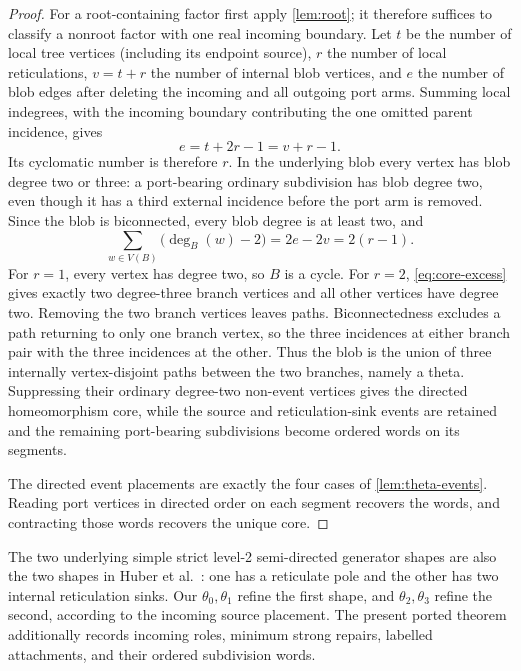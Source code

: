 \documentclass[11pt]{article}
\theoremstyle{remark}
\begin{document}
\begin{proof}
For a root-containing factor first apply \cref{lem:root}; it therefore
suffices to classify a nonroot factor with one real incoming boundary.  Let
$t$ be the number of local tree vertices (including its endpoint source),
$r$ the number of local reticulations, $v=t+r$ the number of internal blob
vertices, and $e$ the number of blob edges after deleting the incoming and
all outgoing port arms.  Summing local indegrees, with the incoming boundary
contributing the one omitted parent incidence, gives
\[
e=t+2r-1=v+r-1.
\]
Its cyclomatic number is therefore $r$.  In the underlying blob every vertex
has blob degree two or three: a port-bearing ordinary subdivision has blob
degree two, even though it has a third external incidence before the port arm
is removed.  Since the blob is biconnected, every blob degree is at least two,
and
\begin{equation}\label{eq:core-excess}
\sum_{w\in V(B)}\bigl(\deg_B(w)-2\bigr)
=2e-2v=2(r-1).
\end{equation}
For $r=1$, every vertex has degree two, so $B$ is a cycle.  For $r=2$,
\eqref{eq:core-excess} gives exactly two degree-three branch vertices and all
other vertices have degree two.  Removing the two branch vertices leaves
paths.  Biconnectedness excludes a path returning to only one branch vertex,
so the three incidences at either branch pair with the three incidences at
the other.  Thus the blob is the union of three internally vertex-disjoint
paths between the two branches, namely a theta.  Suppressing their ordinary
degree-two non-event vertices gives the directed homeomorphism core, while
the source and reticulation-sink events are retained and the remaining
port-bearing subdivisions become ordered words on its segments.

The directed event placements are exactly the four cases of
\cref{lem:theta-events}.  Reading port vertices in directed order on each
segment recovers the words, and contracting those words recovers the unique
core.
\end{proof}

The two underlying simple strict level-2 semi-directed generator shapes are
also the two shapes in Huber et al.~\cite[Lemma~4.2 and Figure~8]{HuberEtAl2025}:
one has a reticulate pole and the other has two internal reticulation sinks.
Our $\theta_0,\theta_1$ refine the first shape, and
$\theta_2,\theta_3$ refine the second, according to the incoming source
placement.  The present ported theorem additionally records incoming roles,
minimum strong repairs, labelled attachments, and their ordered subdivision
words.
\end{document}
